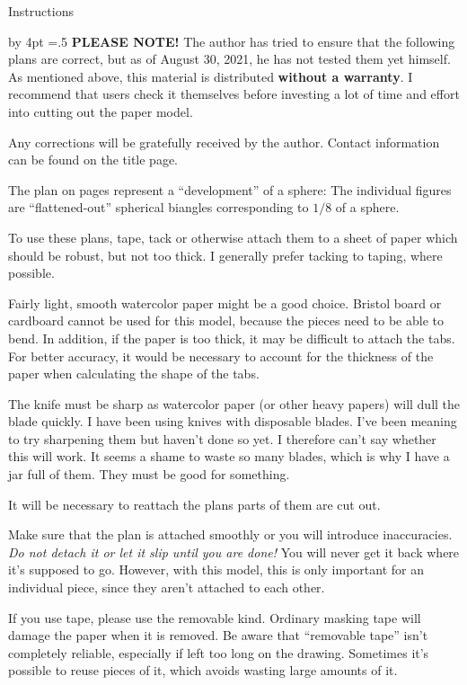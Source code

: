 
\medium
{}
\centerline{{\largebx Instructions}}
\advance\baselineskip by 4pt
\parskip=.5\baselineskip
{\bf PLEASE NOTE!}  The author has tried to ensure that the following
plans are correct, but as of August 30, 2021, he has not tested them
yet himself.  As mentioned above, this material is distributed {\bf without
a warranty}.  I recommend that users check it themselves before
investing a lot of time and effort into cutting out the paper model.

Any corrections will be gratefully received by the author.  Contact
information can be found on the title page.

The plan on pages represent a ``development'' of a sphere:  The individual figures
are ``flattened-out'' spherical biangles corresponding to $1/8$ of a sphere.

To use these plans, tape, tack or otherwise attach them to a sheet of
paper which should be robust, but not too thick.  I generally prefer tacking
to taping, where possible.

Fairly light, smooth
watercolor paper might be a good choice.  Bristol board or cardboard cannot be
used for this model, because the pieces need to be able to bend.  In addition,
if the paper is too thick, it may be difficult to attach the tabs.  For better
accuracy, it would be necessary to account for the thickness of the paper when
calculating the shape of the tabs.

The knife must be sharp as watercolor paper (or other heavy papers) will 
dull the blade quickly.
I have been using knives with disposable blades.  I've been meaning to
try sharpening them but haven't done so yet.  I therefore can't say
whether this will work.  It seems a shame to waste so many blades,
which is why I have a jar full of them.  They must be good for
something. 

It will be necessary to reattach the plans parts of them are cut out.

Make sure that the plan is attached smoothly or you will introduce
inaccuracies.  {\it Do not detach it or let it slip until you are
done!\/}  You will never get it back where it's supposed to go. 
However, with this model, this is only important for an individual piece,
since they aren't attached to each other.

If you use tape, please use the removable kind.  Ordinary masking tape will
damage the paper when it is removed.  Be aware that ``removable tape'' isn't
completely reliable, especially if left too long on the drawing.  Sometimes
it's possible to reuse pieces of it, which avoids wasting large amounts of
it. 
\vfil\eject
\endgroup


